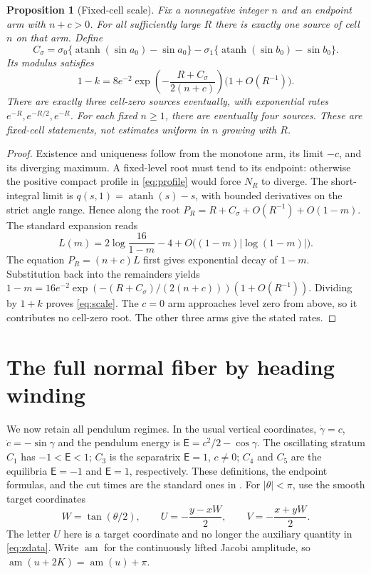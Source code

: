 \documentclass[11pt,a4paper]{article}
\newtheorem{proposition}[theorem]{Proposition}
\theoremstyle{remark}\newtheorem{remark}[theorem]{Remark}
\newcommand{\atanh}{\operatorname{atanh}}
\begin{document}
\begin{proposition}[Fixed-cell scale]\label{prop:scale}
Fix a nonnegative integer $n$ and an endpoint arm with $n+c>0$.
For all sufficiently large $R$ there is exactly one source of cell $n$
on that arm. Define
\[
 C_{\sigma}=\sigma_0\{\atanh(\sin a_0)-\sin a_0\}
 -\sigma_1\{\atanh(\sin b_0)-\sin b_0\}.
\]
Its modulus satisfies
\begin{equation}\label{eq:scale}
 1-k=8e^{-2}\exp\!\left(-\frac{R+C_{\sigma}}{2(n+c)}\right)
 \bigl(1+O(R^{-1})\bigr).
\end{equation}
There are exactly three cell-zero sources eventually, with exponential
rates $e^{-R},e^{-R/2},e^{-R}$. For each fixed $n\ge1$, there are
eventually four sources. These are fixed-cell statements, not estimates
uniform in $n$ growing with $R$.
\end{proposition}
\begin{proof}
Existence and uniqueness follow from the monotone arm, its limit $-c$,
and its diverging maximum. A fixed-level root must tend to its endpoint:
otherwise the positive compact profile in \eqref{eq:profile} would force
$N_R$ to diverge. The short-integral limit is
$q(s,1)=\atanh(s)-s$, with bounded derivatives on the strict angle
range. Hence along the root
$P_R=R+C_{\sigma}+O(R^{-1})+O(1-m)$.
The standard expansion \cite[Section 19.12]{DLMF} reads
\[
 L(m)=2\log\frac{16}{1-m}-4
       +O\bigl((1-m)|\log(1-m)|\bigr).
\]
The equation $P_R=(n+c)L$ first gives exponential decay of $1-m$.
Substitution back into the remainders yields
$1-m=16e^{-2}\exp(-(R+C_{\sigma})/(2(n+c)))
(1+O(R^{-1}))$. Dividing by $1+k$ proves \eqref{eq:scale}.
The $c=0$ arm approaches level zero from above, so it contributes no
cell-zero root. The other three arms give the stated rates.
\end{proof}

\section{The full normal fiber by heading winding}
\label{sec:winding}

We now retain all pendulum regimes. In the usual vertical coordinates,
$\dot\gamma=c$, $\dot c=-\sin\gamma$ and the pendulum energy is
$\mathsf E=c^2/2-\cos\gamma$. The oscillating stratum $C_1$ has
$-1<\mathsf E<1$; $C_3$ is the separatrix $\mathsf E=1$, $c\ne0$;
$C_4$ and $C_5$ are the equilibria $\mathsf E=-1$ and
$\mathsf E=1$, respectively. These definitions, the endpoint formulas,
and the cut times are the standard ones in \cite{MS,SC,SS}.
For $|\theta|<\pi$, use the smooth target coordinates
\begin{equation}\label{eq:UVW}
 W=\tan(\theta/2),\qquad
 U=-\frac{y-xW}{2},\qquad V=-\frac{x+yW}{2}.
\end{equation}
The letter $U$ here is a target coordinate and no longer the auxiliary
quantity in \eqref{eq:zdata}. Write $\operatorname{am}$ for the continuously
lifted Jacobi amplitude, so $\operatorname{am}(u+2K)=\operatorname{am}(u)+\pi$.
\end{document}
